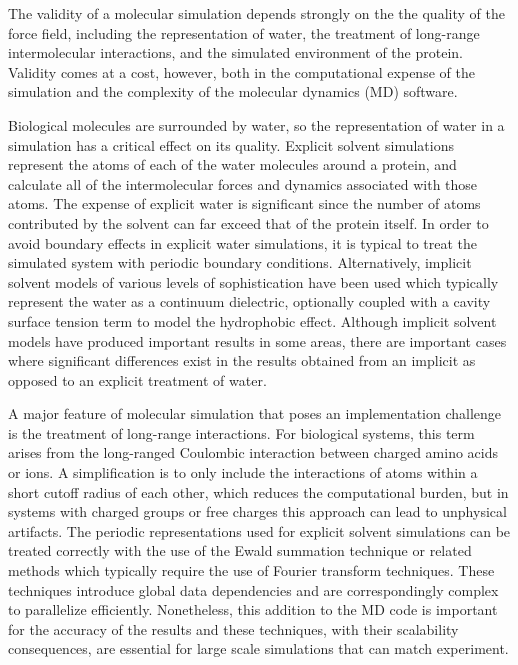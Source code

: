 \documentclass[doublespacing]{elsart}
\begin{document}
The validity of a molecular simulation depends strongly on the the
quality of the force field, including the representation of water, the
treatment of long-range intermolecular interactions, and the simulated
environment of the protein.  Validity comes at a cost, however, both
in the computational expense of the simulation and the complexity of
the molecular dynamics (MD) software.

Biological molecules are surrounded by water, so the representation of
water in a simulation has a critical effect on its quality.  Explicit
solvent simulations represent the atoms of each of the water molecules
around a protein, and calculate all of the intermolecular forces and
dynamics associated with those atoms.  The expense of explicit water
is significant since the number of atoms contributed by the solvent
can far exceed that of the protein itself.  In order to avoid boundary
effects in explicit water simulations, it is typical to treat the
simulated system with periodic boundary conditions.  Alternatively,
implicit solvent models of various levels of sophistication have been
used which typically represent the water as a continuum dielectric,
optionally coupled with a cavity surface tension term to model the
hydrophobic effect.  Although implicit solvent models have produced
important results in some areas, there are important cases where
significant differences exist in the results obtained from an implicit
as opposed to an explicit treatment of water\cite{zhou:2002}.
 
A major feature of molecular simulation that poses an implementation
challenge is the treatment of long-range interactions.  For biological
systems, this term arises from the long-ranged Coulombic interaction
between charged amino acids or ions.  A simplification is to only
include the interactions of atoms within a short cutoff radius of each
other, which reduces the computational burden, but in systems with
charged groups or free charges this approach can lead to unphysical
artifacts\cite{bader:1992}.  The periodic representations used for
explicit solvent simulations can be treated correctly with the use of
the Ewald summation technique\cite{leeuw:1980} or related
methods\cite{hockney:1988} which typically require the use of Fourier
transform techniques.  These techniques introduce global data
dependencies and are correspondingly complex to parallelize
efficiently.  Nonetheless, this addition to the MD code is important
for the accuracy of the results and these techniques, with their
scalability consequences, are essential for large scale simulations
that can match experiment.
\end{document}
